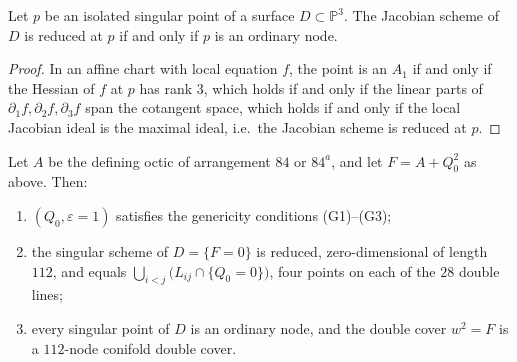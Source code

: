\begin{lemma}\label{lem:reduced-nodal}
Let $p$ be an isolated singular point of a surface $D \subset \mathbb{P}^3$.
The Jacobian scheme of $D$ is reduced at $p$ if and only if $p$ is an
ordinary node.
\end{lemma}

\begin{proof}
In an affine chart with local equation $f$, the point is an $A_1$ if and
only if the Hessian of $f$ at $p$ has rank $3$, which holds if and only if
the linear parts of $\partial_1 f, \partial_2 f, \partial_3 f$ span the
cotangent space, which holds if and only if the local Jacobian ideal is the
maximal ideal, i.e.\ the Jacobian scheme is reduced at $p$.
\end{proof}

\begin{theorem}\label{thm:verified-nodes}
Let $A$ be the defining octic of arrangement $84$ or $84^{a}$, and let
$F = A + Q_0^2$ as above. Then:
\begin{enumerate}
\item[(i)] $(Q_0, \varepsilon = 1)$ satisfies the genericity conditions
  (G1)--(G3);
\item[(ii)] the singular scheme of $D = \{F = 0\}$ is reduced,
  zero-dimensional of length $112$, and equals
  $\bigcup_{i<j} \bigl( L_{ij} \cap \{Q_0 = 0\} \bigr)$, four points on
  each of the $28$ double lines;
\item[(iii)] every singular point of $D$ is an ordinary node, and the
  double cover $w^2 = F$ is a $112$-node conifold double cover.
\end{enumerate}
\end{theorem}


